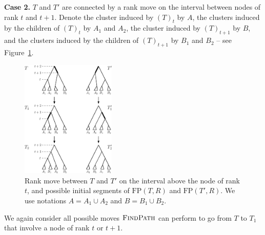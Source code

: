 \documentclass[11pt]{amsart}
\newcommand{\findpath}{\textsc{FindPath}}
\newcommand{\fp}{\mathrm{FP}}
\begin{document}
\textbf{Case 2.}
$T$ and $T'$ are connected by a rank move on the interval between nodes of rank $t$ and $t+1$.
Denote the cluster induced by $(T)_t$ by $A$, the clusters induced by the children of $(T)_t$ by $A_1$ and $A_2$, the cluster induced by $(T)_{t+1}$ by $B$, and the clusters induced by the children of $(T)_{t+1}$ by $B_1$ and $B_2$ -- see Figure~\ref{fig:thm_fp_rank1}.

\begin{figure}[!hbt]
\centering
\includegraphics[width=0.4\textwidth]{thm_fp_rank1}
\caption{Rank move between $T$ and $T'$ on the interval above the node of rank $t$, and possible initial segments of $\fp(T, R)$ and $\fp(T', R)$.
We use notations $A = A_1 \cup A_2$ and $B = B_1 \cup B_2$.}
\label{fig:thm_fp_rank1}
\end{figure}

We again consider all possible moves $\findpath$ can perform to go from $T$ to $T_1$ that involve a node of rank $t$ or $t+1$.
\end{document}
